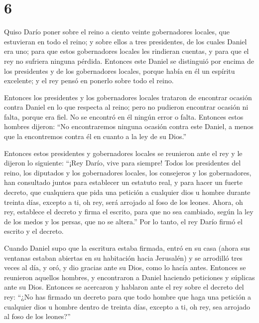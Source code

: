 \hypertarget{section-5}{%
\section{6}\label{section-5}}

 Quiso Darío poner sobre el reino a ciento veinte
gobernadores locales, que estuvieran en todo el reino;  y
sobre ellos a tres presidentes, de los cuales Daniel era uno; para que
estos gobernadores locales les rindieran cuentas, y para que el rey no
sufriera ninguna pérdida.  Entonces este Daniel se
distinguió por encima de los presidentes y de los gobernadores locales,
porque había en él un espíritu excelente; y el rey pensó en ponerlo
sobre todo el reino.

 Entonces los presidentes y los gobernadores locales
trataron de encontrar ocasión contra Daniel en lo que respecta al reino;
pero no pudieron encontrar ocasión ni falta, porque era fiel. No se
encontró en él ningún error o falta.  Entonces estos
hombres dijeron: ``No encontraremos ninguna ocasión contra este Daniel,
a menos que la encontremos contra él en cuanto a la ley de su Dios.''

 Entonces estos presidentes y gobernadores locales se
reunieron ante el rey y le dijeron lo siguiente: ``¡Rey Darío, vive para
siempre!  Todos los presidentes del reino, los diputados y
los gobernadores locales, los consejeros y los gobernadores, han
consultado juntos para establecer un estatuto real, y para hacer un
fuerte decreto, que cualquiera que pida una petición a cualquier dios u
hombre durante treinta días, excepto a ti, oh rey, será arrojado al foso
de los leones.  Ahora, oh rey, establece el decreto y
firma el escrito, para que no sea cambiado, según la ley de los medos y
los persas, que no se altera.''  Por lo tanto, el rey
Darío firmó el escrito y el decreto.

 Cuando Daniel supo que la escritura estaba firmada,
entró en su casa (ahora sus ventanas estaban abiertas en su habitación
hacia Jerusalén) y se arrodilló tres veces al día, y oró, y dio gracias
ante su Dios, como lo hacía antes.  Entonces se reunieron
aquellos hombres, y encontraron a Daniel haciendo peticiones y súplicas
ante su Dios.  Entonces se acercaron y hablaron ante el
rey sobre el decreto del rey: ``¿No has firmado un decreto para que todo
hombre que haga una petición a cualquier dios u hombre dentro de treinta
días, excepto a ti, oh rey, sea arrojado al foso de los leones?''

